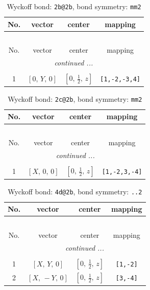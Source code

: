\documentclass[fleqn,8pt]{jsarticle}
\begin{document}
\begin{longtable}{cccc}
\caption{Wyckoff bond: {\tt 2b@2b}, bond symmetry: {\tt mm2}}
 \\
 \hline \hline
No. & vector & center & mapping \\ \hline \endfirsthead

\multicolumn{3}{l}{\tablename\ \thetable{}} \\
 \hline \hline
No. & vector & center & mapping \\ \hline \endhead

 \hline \hline
\multicolumn{3}{r}{\footnotesize\it continued ...} \\ \endfoot

 \hline \hline
\multicolumn{3}{r}{} \\ \endlastfoot

1 & $\left[ 0,\, Y,\, 0 \right]$ & $\left[ 0,\, \frac{1}{2},\, z \right]$ & {\tt [1,-2,-3,4]} \\
\end{longtable}
\renewcommand{\arraystretch}{1.2}
\begin{longtable}{cccc}
\caption{Wyckoff bond: {\tt 2c@2b}, bond symmetry: {\tt mm2}}
 \\
 \hline \hline
No. & vector & center & mapping \\ \hline \endfirsthead

\multicolumn{3}{l}{\tablename\ \thetable{}} \\
 \hline \hline
No. & vector & center & mapping \\ \hline \endhead

 \hline \hline
\multicolumn{3}{r}{\footnotesize\it continued ...} \\ \endfoot

 \hline \hline
\multicolumn{3}{r}{} \\ \endlastfoot

1 & $\left[ X,\, 0,\, 0 \right]$ & $\left[ 0,\, \frac{1}{2},\, z \right]$ & {\tt [1,-2,3,-4]} \\
\end{longtable}
\renewcommand{\arraystretch}{1.2}
\begin{longtable}{cccc}
\caption{Wyckoff bond: {\tt 4d@2b}, bond symmetry: {\tt ..2}}
 \\
 \hline \hline
No. & vector & center & mapping \\ \hline \endfirsthead

\multicolumn{3}{l}{\tablename\ \thetable{}} \\
 \hline \hline
No. & vector & center & mapping \\ \hline \endhead

 \hline \hline
\multicolumn{3}{r}{\footnotesize\it continued ...} \\ \endfoot

 \hline \hline
\multicolumn{3}{r}{} \\ \endlastfoot

1 & $\left[ X,\, Y,\, 0 \right]$ & $\left[ 0,\, \frac{1}{2},\, z \right]$ & {\tt [1,-2]} \\ \hline
2 & $\left[ X,\, - Y,\, 0 \right]$ & $\left[ 0,\, \frac{1}{2},\, z \right]$ & {\tt [3,-4]} \\
\end{longtable}
\end{document}
